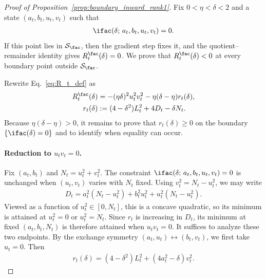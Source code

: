 \documentclass{article}
\begin{document}
\begin{proof}[Proof of Proposition~\ref{prop:boundary_inward_rank1}]
Fix $0<\eta<\delta<2$ and a state $(a_t,b_t,u_t,v_t)$ such that
\begin{align*}
    \ifac(\delta;\,a_t,b_t,u_t,v_t)=0.
\end{align*}
If this point lies in $\mathcal S_\fac$, then the gradient step fixes it, and the
quotient--remainder identity gives $R_t^\fac(\delta)=0$. We prove that
$R_t^\fac(\delta)<0$ at every boundary point outside $\mathcal S_\fac$.

Rewrite Eq.~\eqref{eq:R_t_def} as
\begin{align}
    R_t^\fac(\delta)
    &=-(\eta\delta)^2u_t^2v_t^2
      -\eta(\delta-\eta)r_t(\delta),
      \label{eq:R_as_minus}\\
    r_t(\delta)
    &:= (4-\delta^2)L_t^2+4D_t-\delta N_t.
    \label{eq:r_fac_def}
\end{align}
Because $\eta(\delta-\eta)>0$, it remains to prove that $r_t(\delta)\ge0$
on the boundary $\{\ifac(\delta)=0\}$ and to identify when equality can occur.

\paragraph{Reduction to $u_tv_t=0$.}
Fix $(a_t,b_t)$ and $N_t=u_t^2+v_t^2$. The constraint
$\ifac(\delta;\,a_t,b_t,u_t,v_t)=0$ is unchanged when $(u_t,v_t)$ varies
with $N_t$ fixed. Using
$v_t^2=N_t-u_t^2$, we may write
\begin{align}
    D_t
    =a_t^2(N_t-u_t^2)+b_t^2u_t^2+u_t^2(N_t-u_t^2).
\end{align}
Viewed as a function of $u_t^2\in[0,N_t]$, this is a concave quadratic, so its
minimum is attained at $u_t^2=0$ or $u_t^2=N_t$. Since $r_t$ is increasing in
$D_t$, its minimum at fixed $(a_t,b_t,N_t)$ is therefore attained when
$u_tv_t=0$. It suffices to analyze these two endpoints. By the exchange symmetry
$(a_t,u_t)\leftrightarrow(b_t,v_t)$, we first take $u_t=0$. Then
\begin{align}
    r_t(\delta)
    =(4-\delta^2)L_t^2+(4a_t^2-\delta)v_t^2.
    \label{eq:r_reduced_fac}
\end{align}


\end{proof}
\end{document}
